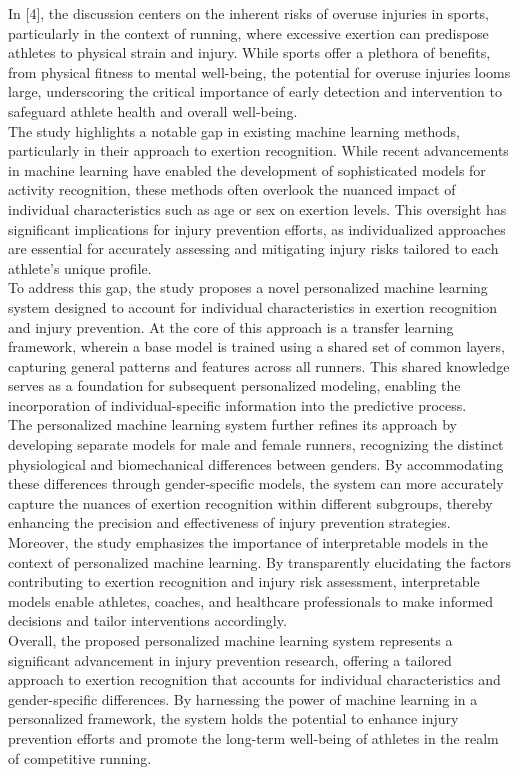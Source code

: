 \documentclass[12pt, English]{article}
\begin{document}
\begin{normalsize}
In [4], the discussion centers on the inherent risks of overuse injuries in sports, particularly in the context of running, where excessive exertion can predispose athletes to physical strain and injury. While sports offer a plethora of benefits, from physical fitness to mental well-being, the potential for overuse injuries looms large, underscoring the critical importance of early detection and intervention to safeguard athlete health and overall well-being.\\
The study highlights a notable gap in existing machine learning methods, particularly in their approach to exertion recognition. While recent advancements in machine learning have enabled the development of sophisticated models for activity recognition, these methods often overlook the nuanced impact of individual characteristics such as age or sex on exertion levels. This oversight has significant implications for injury prevention efforts, as individualized approaches are essential for accurately assessing and mitigating injury risks tailored to each athlete's unique profile.\\
To address this gap, the study proposes a novel personalized machine learning system designed to account for individual characteristics in exertion recognition and injury prevention. At the core of this approach is a transfer learning framework, wherein a base model is trained using a shared set of common layers, capturing general patterns and features across all runners. This shared knowledge serves as a foundation for subsequent personalized modeling, enabling the incorporation of individual-specific information into the predictive process.\\
The personalized machine learning system further refines its approach by developing separate models for male and female runners, recognizing the distinct physiological and biomechanical differences between genders. By accommodating these differences through gender-specific models, the system can more accurately capture the nuances of exertion recognition within different subgroups, thereby enhancing the precision and effectiveness of injury prevention strategies.\\
Moreover, the study emphasizes the importance of interpretable models in the context of personalized machine learning. By transparently elucidating the factors contributing to exertion recognition and injury risk assessment, interpretable models enable athletes, coaches, and healthcare professionals to make informed decisions and tailor interventions accordingly.\\
Overall, the proposed personalized machine learning system represents a significant advancement in injury prevention research, offering a tailored approach to exertion recognition that accounts for individual characteristics and gender-specific differences. By harnessing the power of machine learning in a personalized framework, the system holds the potential to enhance injury prevention efforts and promote the long-term well-being of athletes in the realm of competitive running.
\\


\end{normalsize}
\end{document}
